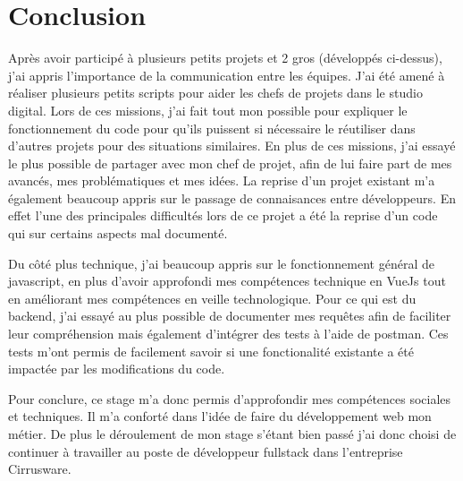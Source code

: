\section{Conclusion}

Après avoir participé à plusieurs petits projets et 2 gros (développés ci-dessus), j'ai appris l'importance de la communication entre les équipes. J'ai été amené à réaliser plusieurs petits scripts pour aider les chefs de projets dans le studio digital. Lors de ces missions, j'ai fait tout mon possible pour expliquer le fonctionnement du code pour qu'ils puissent si nécessaire le réutiliser dans d'autres projets pour des situations similaires. En plus de ces missions, j'ai essayé le plus possible  de partager avec mon chef de projet, afin de lui faire part de mes avancés, mes problématiques et mes idées. La reprise d'un projet existant m'a également beaucoup appris sur le passage de connaisances entre développeurs. En effet l'une des principales difficultés lors de ce projet a été la reprise d'un code qui sur certains aspects mal documenté. 

Du côté plus technique, j'ai beaucoup appris sur le fonctionnement général de javascript, en plus d'avoir approfondi mes compétences technique en VueJs tout en améliorant mes compétences en veille technologique. Pour ce qui est du backend, j'ai essayé au plus possible de documenter mes requêtes afin de faciliter leur compréhension mais également d'intégrer des tests à l'aide de postman. Ces tests m'ont permis de facilement savoir si une fonctionalité existante a été impactée par les modifications du code. 

Pour conclure, ce stage m'a donc permis d'approfondir mes compétences sociales et techniques. Il m'a conforté dans l'idée de faire du développement web mon métier. De plus le déroulement de mon stage s'étant bien passé j'ai donc choisi de continuer à travailler au poste de développeur fullstack dans l'entreprise Cirrusware. 